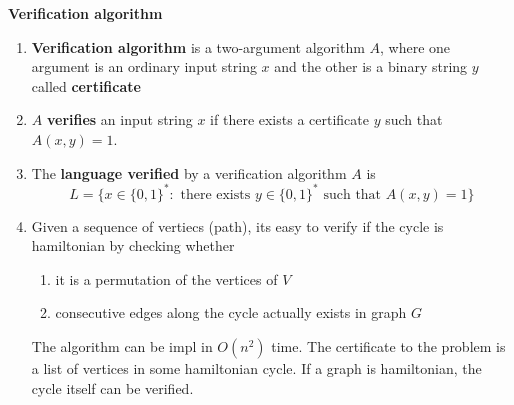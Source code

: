 \documentclass[11pt]{article}
\begin{document}
\begin{defn*}
    \textbf{Verification algorithm} 
    \begin{enumerate}
        \item \textbf{Verification algorithm} is a two-argument algorithm $A$, where one argument is an ordinary input string $x$ and the other is a binary string $y$ called \textbf{certificate}
        \item $A$ \textbf{verifies} an input string $x$ if there exists a certificate $y$ such that $A(x,y) = 1$. 
        \item The \textbf{language verified} by a verification algorithm $A$ is 
        \[
            L = \{ x\in \{ 0,1\}^*: \text{ there exists } y\in \{0,1 \}^* \text{ such that } A(x,y) = 1 \}
        \]
        \item Given a sequence of vertiecs (path), its easy to verify if the cycle is hamiltonian by checking whether 
        \begin{enumerate}
            \item it is a permutation of the vertices of $V$
            \item consecutive edges along the cycle actually exists in graph $G$
        \end{enumerate}
        The algorithm can be impl in $O(n^2)$ time. The certificate to the problem is a list of vertices in some hamiltonian cycle. If a graph is hamiltonian, the cycle itself can be verified. 
    \end{enumerate}
   
\end{defn*}
\end{document}
